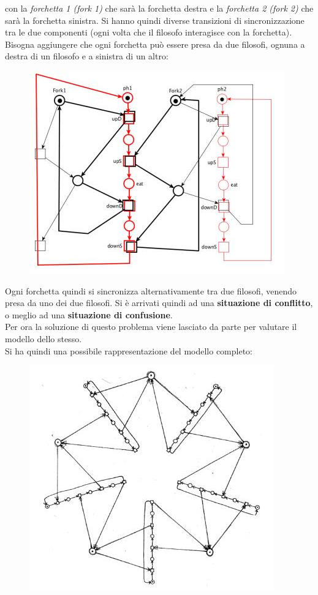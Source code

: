 \documentclass[a4paper,12pt, oneside]{book}
\begin{document}
con la \textit{forchetta 1 (fork 1)} che sarà la forchetta destra e la
\textit{forchetta 2 (fork 2)} che sarà la forchetta sinistra. Si hanno quindi
diverse transizioni di sincronizzazione tra le due componenti (ogni volta che il
filosofo interagisce con la forchetta).\\
Bisogna aggiungere che ogni forchetta può essere presa da due filosofi, ognuna a
destra di un filosofo e a sinistra di un altro:
\begin{figure}[H]
  \centering
  \includegraphics[scale = 0.5]{img/pt14.jpg}
\end{figure}
Ogni forchetta quindi si sincronizza alternativamente tra due filosofi, venendo
presa da uno dei due filosofi. Si è arrivati quindi ad una \textbf{situazione di
  conflitto}, o meglio ad una \textbf{situazione di confusione}.\\
Per ora la soluzione di questo problema viene lasciato da parte per valutare il
modello dello stesso.\\
Si ha quindi una possibile rappresentazione del modello completo:
\begin{figure}[H]
  \centering
  \includegraphics[scale = 0.5]{img/pt15.jpg}
\end{figure}
\end{document}
